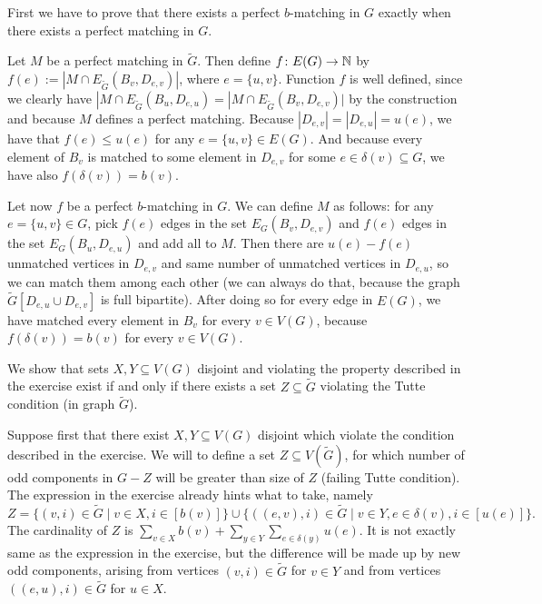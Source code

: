 \begin{exercise}{3}
    First we have to prove that there exists a perfect $b$-matching in $G$
    exactly when there exists a perfect matching in $G$.

    Let $M$ be a perfect matching in $\tilde{G}$. Then define $f \colon E(G) \to
    \mathbb{N}$ by $f(e) := | M \cap E_{\tilde{G}}(B_v, D_{e, v}) |$, where $e = \{u,
    v\}$. Function $f$ is well defined, since we clearly have $| M \cap
    E_{\tilde{G}}(B_u, D_{e, u}) = | M \cap E_{\tilde{G}}(B_v, D_{e, v}) |$ by
    the construction and because $M$ defines a perfect matching. Because $|D_{e,
    v}| = |D_{e, u}| = u(e)$, we have that $f(e) \leq u(e)$ for any $e = \{u,
    v\} \in E(G)$. And because every element of $B_v$ is matched to some element
    in $D_{e, v}$ for some $e \in \delta(v) \subseteq G$, we have also
    $f(\delta(v)) = b(v)$.

    Let now $f$ be a perfect $b$-matching in $G$. We can define $M$ as follows:
    for any $e = \{u, v\} \in G$, pick $f(e)$ edges in the set $E_G(B_v, D_{e,
    v})$ and $f(e)$ edges in the set $E_G(B_u, D_{e, u})$ and add all to $M$.
    Then there are $u(e) - f(e)$ unmatched vertices in $D_{e, v}$ and same
    number of unmatched vertices in $D_{e, u}$, so we can match them among each
    other (we can always do that, because the graph $\tilde{G}[D_{e, u} \cup
    D_{e, v}]$ is full bipartite). After doing so for every edge in $E(G)$, we
    have matched every element in $B_v$ for every $v \in V(G)$, because
    $f(\delta(v)) = b(v)$ for every $v \in V(G)$.

    We show that sets $X, Y \subseteq V(G)$ disjoint and violating the property
    described in the exercise exist if and only if there exists a set $Z \subseteq
    \tilde{G}$ violating the Tutte condition (in graph $\tilde{G}$).

    Suppose first that there exist $X, Y \subseteq V(G)$ disjoint which violate
    the condition described in the exercise. We will to define a set $Z
    \subseteq V(\tilde{G})$, for which number of odd components in $G - Z$ will
    be greater than size of $Z$ (failing Tutte condition). The expression in the
    exercise already hints what to take, namely
    \begin{equation*}
        Z = \{ (v, i) \in \tilde{G} \mid v \in X, i \in [b(v)] \} \cup \{ ((e, v), i) \in
        \tilde{G} \mid v \in Y, e \in \delta(v), i \in [u(e)] \}.
    \end{equation*}
    The cardinality of $Z$ is $\sum_{v \in X} b(v) + \sum_{y \in Y} \sum_{e \in
    \delta(y)} u(e)$. It is not exactly same as the expression in the exercise,
    but the difference will be made up by new odd components, arising from
    vertices $(v, i) \in \tilde{G}$ for $v \in Y$ and from vertices $((e, u), i)
    \in \tilde{G}$ for $u \in X$.


\end{exercise}
